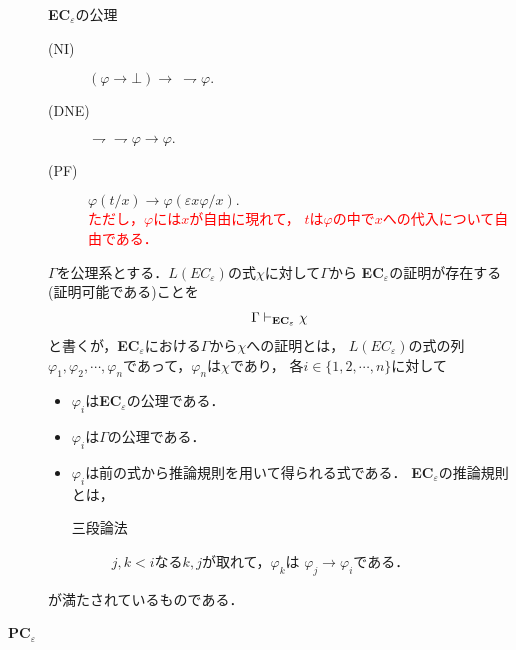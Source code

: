 \begin{description}
\begin{itembox}[l]{{\bf EC}${}_{\varepsilon}$の公理}
\begin{description}
			\item[(NI)] $(\varphi \rightarrow \bot) \rightarrow\ \rightharpoondown \varphi.$
			\item[(DNE)] $\rightharpoondown \rightharpoondown \varphi \rightarrow \varphi.$
			\item[(PF)] $\varphi(t/x) \rightarrow \varphi(\varepsilon x \varphi/x).$
				\\ \textcolor{red}{ただし，$\varphi$には$x$が自由に現れて，
				$t$は$\varphi$の中で$x$への代入について自由である．}
		\end{description}
	\end{itembox}
	
	$\Gamma$を公理系とする．$L(EC_{\varepsilon})$の式$\chi$に対して$\Gamma$から
	{\bf EC}${}_{\varepsilon}$の証明が存在する(証明可能である)ことを
	\begin{align}
		\Gamma \vdash_{{\scriptsize \mbox{{\bf EC}${}_{\varepsilon}$}}} \chi
	\end{align}
	と書くが，{\bf EC}${}_{\varepsilon}$における$\Gamma$から$\chi$への証明とは，
	$L(EC_{\varepsilon})$の式の列$\varphi_{1},\varphi_{2},
	\cdots,\varphi_{n}$であって，$\varphi_{n}$は$\chi$であり，
	各$i \in \{1,2,\cdots,n\}$に対して
	\begin{itemize}
		\item $\varphi_{i}$は{\bf EC}${}_{\varepsilon}$の公理である．
		\item $\varphi_{i}$は$\Gamma$の公理である．
		\item $\varphi_{i}$は前の式から推論規則を用いて得られる式である．
			{\bf EC}${}_{\varepsilon}$の推論規則とは，
			\begin{description}
			\item[三段論法]
				$j,k < i$なる$k,j$が取れて，$\varphi_{k}$は
				$\varphi_{j} \rightarrow \varphi_{i}$である．
		\end{description} 
	\end{itemize}
	が満たされているものである．
	
	\item[{\bf PC}${}_{\varepsilon}$]\mbox{}
	

\end{description}
